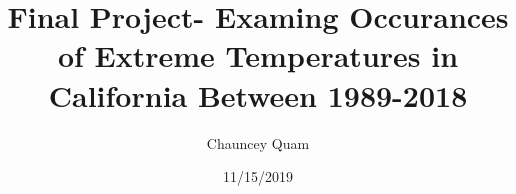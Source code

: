 \documentclass[]{article}
\title{Final Project- Examing Occurances of Extreme Temperatures in California
Between 1989-2018}
\author{Chauncey Quam}
\date{11/15/2019}
\begin{document}
\maketitle

\hypertarget{in-this-project-i-will-be-examining-daily-temperature-observations-for-selected-counties-in-california-during-the-past-30-years-from-1989-2018.-these-counties-were-selected-because-they-are-all-major-agricultural-producing-counties-in-california.-extreme-temperature-can-have-a-drastic-effect-on-crop-yield.-as-climate-in-california-changes-our-current-agricultural-production-regions-of-california-might-become-less-productive-with-longer-instances-of-days-with-extreme-temperatures.-this-project-attempts-to-explore-instances-of-extreme-temperatures-classified-in-this-study-as-temperatures-of-105-degrees-or-higher-to-see-if-temperatures-are-rising-in-california.-this-project-will-not-explore-the-relationship-of-extreme-temperatures-and-decrease-in-crop-yeild-but-simply-tries-to-show-that-occurences-of-extreme-temperatures-have-been-increasing-in-our-state-over-the-past-30-years.}{%
}
\end{document}
